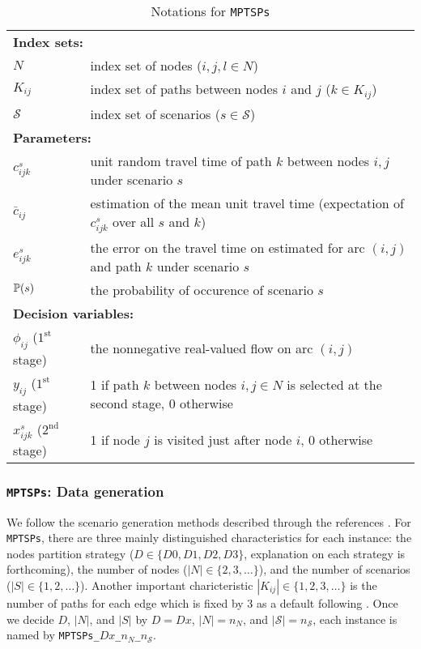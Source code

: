 \begin{table}[H]
	\caption{Notations for \texttt{MPTSPs}}
	\label{mptsps:notation}
	\resizebox{\textwidth}{!}
	{
		\begin{tabular}{ll}
			\toprule
			\multicolumn{2}{l}{\textbf{Index sets:}} \\
			$N$ & \textrm{index set of nodes ($i,j,l\in N$)} \\ 
			$K_{ij}$ & \textrm{index set of paths between nodes $i$ and $j$ ($k\in K_{ij}$)} \\ 
			$\mathcal{S}$ & \textrm{index set of scenarios ($s\in \mathcal{S}$)}\\ \midrule
			\multicolumn{2}{l}{\textbf{Parameters:}} \\
			$c_{ijk}^{s}$ & \textrm{unit random travel time of path $k$ between nodes $i,j$ under scenario $s$} \\ 
			$\bar{c}_{ij}$ & \textrm{estimation of the mean unit travel time (expectation of $c_{ijk}^{s}$ over all $s$ and $k$)} \\ 
			$e_{ijk}^{s}$ & \textrm{the error on the travel time on estimated for arc $(i,j)$ and path $k$ under scenario $s$} \\ 
			$\operatorname*{\mathbb{P}}(s)$ & \textrm{the probability of occurence of scenario $s$} \\  \midrule
			\multicolumn{2}{l}{\textbf{Decision variables:}} \\
			$\phi_{ij}$ ($1^{\textrm{st}}$ stage) & \textrm{the nonnegative real-valued flow on arc $(i,j)$}\\
			$y_{ij}$ ($1^{\textrm{st}}$ stage)& \textrm{1 if path $k$ between nodes $i,j\in N$ is selected at the second stage, 0 otherwise} \\  
			$x_{ijk}^{s}$ ($2^{\textrm{nd}}$ stage) & \textrm{1 if node $j$ is visited just after node $i$, 0 otherwise} \\ 
			\bottomrule
		\end{tabular}
	}
\end{table} 


\subsubsection{\texttt{MPTSPs}: Data generation}
We follow the scenario generation methods described through the references \cite{journal:MPT2014,journal:PGM2017,journal:TPP2017}. For \texttt{MPTSPs}, there are three mainly distinguished characteristics for each instance: the nodes partition strategy ($D\in\{D0,D1,D2,D3\}$, explanation on each strategy is forthcoming), the number of nodes ($|N|\in\{2,3,\ldots\}$), and the number of scenarios ($|S|\in\{1,2,\ldots\}$). Another important charicteristic $|K_{ij}|\in\{1,2,3,\ldots\}$ is the number of paths for each edge which is fixed by 3 as a default following \cite{journal:TPP2017}. Once we decide $D$, $|N|$, and $|S|$ by $D=Dx$, $|N|=n_N$, and $|\mathcal{S}|=n_\mathcal{S}$, each instance is named by \texttt{MPTSPs\_$Dx$\_$n_N$\_$n_\mathcal{S}$}.

